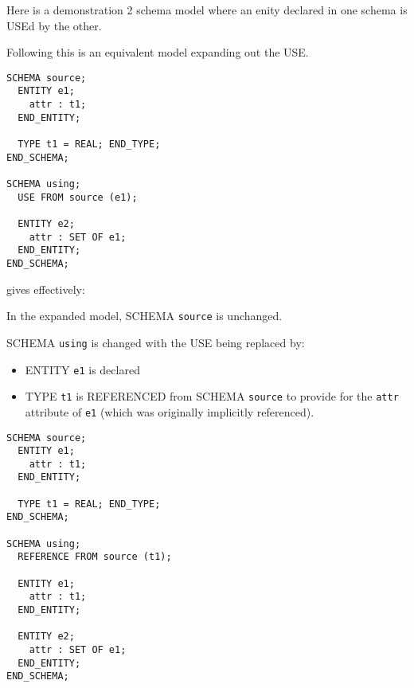 \begin{remarks}
\remintro


Here is a demonstration 2 schema model where an enity declared
in one schema is USEd by the other.

 Following this is an equivalent model expanding out the USE.

\remend
\end{remarks}


\begin{verbatim}
SCHEMA source;
  ENTITY e1;
    attr : t1;
  END_ENTITY;

  TYPE t1 = REAL; END_TYPE;
END_SCHEMA;

SCHEMA using;
  USE FROM source (e1);

  ENTITY e2;
    attr : SET OF e1;
  END_ENTITY;
END_SCHEMA;
\end{verbatim}
gives effectively:

\begin{remarks}
\remintro


In the expanded model, SCHEMA \texttt{source} is unchanged.

SCHEMA \texttt{using} is changed with the USE being replaced by:
\begin{itemize}
\item ENTITY \texttt{e1} is declared 
\item TYPE \texttt{t1} is REFERENCED from SCHEMA \texttt{source}
      to provide for the \texttt{attr} attribute of \texttt{e1}
      (which was originally implicitly referenced).
\end{itemize}

\remend
\end{remarks}


\begin{verbatim}
SCHEMA source;
  ENTITY e1;
    attr : t1;
  END_ENTITY;

  TYPE t1 = REAL; END_TYPE;
END_SCHEMA;

SCHEMA using;
  REFERENCE FROM source (t1);

  ENTITY e1;
    attr : t1;
  END_ENTITY;

  ENTITY e2;
    attr : SET OF e1;
  END_ENTITY;
END_SCHEMA;
\end{verbatim}

